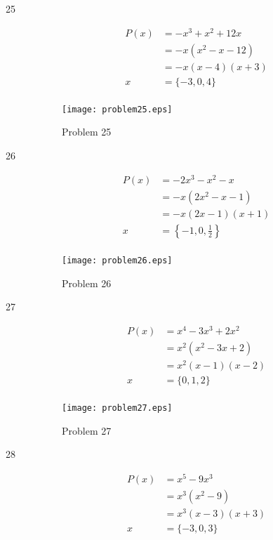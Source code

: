 \documentclass[landscape]{exam}
\begin{document}
\begin{description}
    \item[25] 
      \begin{align*}
        P(x) &= -x^3 + x^2 + 12x \\
             &= -x(x^2 - x - 12) \\
             &= -x(x - 4)(x + 3) \\
        x    &= \{ -3, 0, 4 \} \\
      \end{align*}
      
      \begin{figure}[H]
        \centering
        \texttt{[image: problem25.eps]}
        \caption*{Problem 25}
      \end{figure}

    \item[26] 
      \begin{align*}
        P(x) &= -2x^3 - x^2 - x \\
             &= -x(2x^2 - x - 1) \\
             &= -x(2x - 1)(x + 1) \\
        x    &= \left\{ -1, 0, \frac{1}{2} \right\} \\
      \end{align*}
      
      \begin{figure}[H]
        \centering
        \texttt{[image: problem26.eps]}
        \caption*{Problem 26}
      \end{figure}

    \item[27] 
      \begin{align*}
        P(x) &= x^4 - 3x^3 + 2x^2 \\
             &= x^2(x^2 - 3x + 2) \\
             &= x^2(x - 1)(x - 2) \\
        x    &= \{ 0, 1, 2 \} \\
      \end{align*}
      
      \begin{figure}[H]
        \centering
        \texttt{[image: problem27.eps]}
        \caption*{Problem 27}
      \end{figure}

    \pagebreak

    \item[28] 
      \begin{align*}
        P(x) &= x^5 - 9x^3 \\
             &= x^3(x^2 - 9) \\
             &= x^3(x - 3)(x + 3) \\
        x    &= \{ -3, 0, 3 \} \\
      \end{align*}
      

\end{description}
\end{document}

